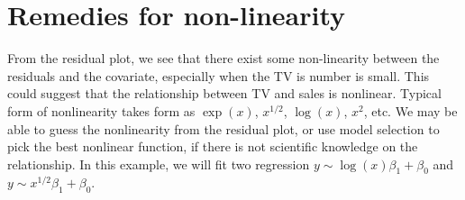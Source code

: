 \documentclass[12pt,]{book}
\newenvironment{Shaded}{\begin{snugshade}}{\end{snugshade}}
\newcommand{\KeywordTok}[1]{\textcolor[rgb]{0.13,0.29,0.53}{\textbf{#1}}}
\newcommand{\DataTypeTok}[1]{\textcolor[rgb]{0.13,0.29,0.53}{#1}}
\newcommand{\DecValTok}[1]{\textcolor[rgb]{0.00,0.00,0.81}{#1}}
\newcommand{\StringTok}[1]{\textcolor[rgb]{0.31,0.60,0.02}{#1}}
\newcommand{\OperatorTok}[1]{\textcolor[rgb]{0.81,0.36,0.00}{\textbf{#1}}}
\newcommand{\NormalTok}[1]{#1}
\begin{document}
\begin{Shaded}
\end{Shaded}

\section{Remedies for non-linearity}\label{remedies-for-non-linearity}

From the residual plot, we see that there exist some non-linearity
between the residuals and the covariate, especially when the TV is
number is small. This could suggest that the relationship between TV and
sales is nonlinear. Typical form of nonlinearity takes form as
\(\exp(x)\), \(x^{1/2}\), \(\log(x)\), \(x^2\), etc. We may be able to
guess the nonlinearity from the residual plot, or use model selection to
pick the best nonlinear function, if there is not scientific knowledge
on the relationship. In this example, we will fit two regression
\(y\sim \log(x)\beta_1 + \beta_0\) and
\(y \sim x^{1/2} \beta_1 + \beta_0\).
\end{document}
